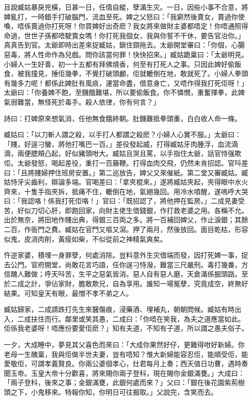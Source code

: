 \documentclass[a5paper, 12pt, openany]{book} %
\begin{document}
	且說臧姑暴戾兇橫，日甚一日，任情自縱，孽滿生灾。一日，因些小事不合意，將婢亂打，一時錯手打破腦門，流血至死。婢之父怒曰：「我窮然後賣女，賣過你使喚，唔係賣過你打死呀！你買婢好出奇麽？我女將來做財主婆都唔定！你唔通照得命過，世世子孫都唔駛賣女嗎！你打死我個女，我與你誓不干休，要告官治你。」真真告到官。太爺即時出差來捉臧姑，鎖住頸拖去。太爺開堂審曰：「你個，心腸惡毒，將人性命作為兒戲。問你該當何罪！快快招來。」臧姑跪稟曰：「太爺明見。小婦人一生好善，初一十五都有拜佛燒香，何至有打死人之事。只因此婢好偷飯食，被我撞見，捶佢幾拳，不覺打破頭顱，佢就轆倒在地，敢就死了。小婦人拳頭有幾多力呢！都係此婢肚有風痰，運當命盡，借意身亡，又唔作得我打死佢呀！」太爺曰：「你養婢不飽，至饑餓難堪，所以要偷飯食。你不憐憫，重奮揮拳，此婢氣弱難當，無怪死於毒手。殺人依律，你有何言？」

	詩曰：打婢原來想氣消，任他無食餓終朝。肚饑難抵拳頭重，白白收人命一條。

	臧姑曰：「以刀斬人謂之殺，以手打人都謂之殺麽？小婦人心實不服。」太爺曰：「賤，好逞刁蠻，將他打嘴巴一百。」差役發起威，打得臧姑牙肉腫浮，血流滴滴，兩便腮頰凸起，好似豬頭咁大。臧姑且哭且罵，以手指住太爺，話官恃强欺佢。太爺發怒，喝起差役，重打一百藤鞭。打得血肉交飛，仍然未肯招認。官呌差曰：「且將賤婦押住班房安置。」第二巡放告，婢父又來催紙。第二堂又審臧姑。臧姑恃牙尖齒利，辯論多端。官喝差曰：「拿夾棍來。」遂將臧姑夾起，夾得眼中水火齊來，十隻手指夾拆，抵痛不住，轆倒在地，氣絕幾回。用冷水噴醒，遂嗚呼大哭曰：「我認咯！係我打死佢咯！」官曰：「既招認了，將他押在監房。」二成見妻受苦，好似刀切心肝，即跑回家，向財主佬生借錢銀，作打救老婆之用。各稱不允。出於無奈，將田地作賤出典，得銀三百両之多。將一百補回婢父，作止淚銀；其餘二百，作衙門之費。臧姑在官門又嘔又瀉。押了兩月，然後放回。面目乾枯，形容似鬼，皮消肉削，黃瘦如柴，不似從前之神精氣爽矣。

	忤逆家婆，積埋一身罪孽，何處消除。豈料意外生灾借端而發，因打死婢一事，捉去公門。官府開堂，尚敢花言巧語，任你逞刁恃潑，難當三尺嚴刑。毒打幾番，方信醜人難做；呼天呌苦，生平之惡氣皆消。惡人自有惡人磨，天倉滿係掘頭路。至於二成之計，爭佔家財，膽敢欺兄，自為享用。誰知一場冤孽，究竟成空，終無好結果。可知皇天有眼，最憎不孝不弟之人。

	臧姑歸家，二成請跌打先生來醫傷痕，浸藥酒、埋補丸，朝朝問候。臧姑有時出入，二成扶住而行。鄰里或笑其愚，二成曰：「你唔在笑我，為夫之道應當如此。佢係我老婆呀！唔應份要愛佢麽？」知有夫道，不知有子道，所以謂之愚夫俗子。

	一夕，大成睡中，夢見其父喜色而來曰：「大成你果然好仔，更難得咁好新婦。你老母一生醜稟，我與佢做半世夫妻，豈有唔知？惟大新婦能容忍佢，能順受佢，能愛敬佢，可謂孝義賢良。你兩公婆個孝心，灶君每月上奏；西天值日功曹，遇時奏聞玉帝。玉皇大帝十分歡喜，將來賜你兩子登科，現在賜你金銀滿甕。」大成曰：「兩子登科，後來之事；金銀滿甕，此銀何處而來？」父曰：「銀在後花園紫荊樹頭之下，小鬼移來。特報你知，你明日可往掘取。」父說完，含笑而去。
\end{document}
